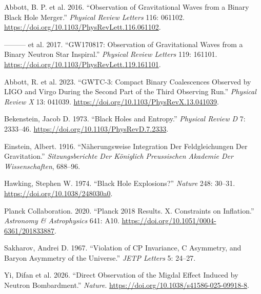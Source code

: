 \documentclass[
  11pt,
  letterpaper,
  twoside,
  openright]{book}
\newlength{\cslhangindent}
\newenvironment{CSLReferences}[2] %
 {\begin{list}{}{%
  \setlength{\itemindent}{0pt}
  \setlength{\leftmargin}{0pt}
  \setlength{\parsep}{0pt}
  \ifodd #1
   \setlength{\leftmargin}{\cslhangindent}
   \setlength{\itemindent}{-1\cslhangindent}
  \fi
  \setlength{\itemsep}{#2\baselineskip}}}
 {\end{list}}
\begin{document}
\label{refs}
\begin{CSLReferences}{1}{0}
Abbott, B. P. et al. 2016. {``Observation of Gravitational Waves from a
Binary Black Hole Merger.''} \emph{Physical Review Letters} 116: 061102.
\url{https://doi.org/10.1103/PhysRevLett.116.061102}.

--------- et al. 2017. {``GW170817: Observation of Gravitational Waves
from a Binary Neutron Star Inspiral.''} \emph{Physical Review Letters}
119: 161101. \url{https://doi.org/10.1103/PhysRevLett.119.161101}.

Abbott, R. et al. 2023. {``GWTC-3: Compact Binary Coalescences Observed
by LIGO and Virgo During the Second Part of the Third Observing Run.''}
\emph{Physical Review X} 13: 041039.
\url{https://doi.org/10.1103/PhysRevX.13.041039}.

Bekenstein, Jacob D. 1973. {``Black Holes and Entropy.''} \emph{Physical
Review D} 7: 2333--46. \url{https://doi.org/10.1103/PhysRevD.7.2333}.

Einstein, Albert. 1916. {``N{ä}herungsweise Integration Der
Feldgleichungen Der Gravitation.''} \emph{Sitzungsberichte Der
K{ö}niglich Preussischen Akademie Der Wissenschaften}, 688--96.

Hawking, Stephen W. 1974. {``Black Hole Explosions?''} \emph{Nature}
248: 30--31. \url{https://doi.org/10.1038/248030a0}.

Planck Collaboration. 2020. {``Planck 2018 Results. {X}. Constraints on
Inflation.''} \emph{Astronomy \& Astrophysics} 641: A10.
\url{https://doi.org/10.1051/0004-6361/201833887}.

Sakharov, Andrei D. 1967. {``Violation of {CP} Invariance, {C}
Asymmetry, and Baryon Asymmetry of the Universe.''} \emph{JETP Letters}
5: 24--27.

Yi, Difan et al. 2026. {``Direct Observation of the {Migdal} Effect
Induced by Neutron Bombardment.''} \emph{Nature}.
\url{https://doi.org/10.1038/s41586-025-09918-8}.

\end{CSLReferences}


\backmatter
\end{document}
